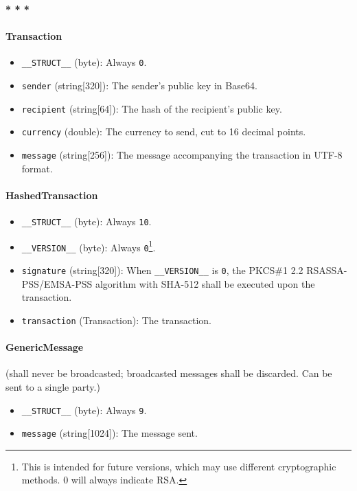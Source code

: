 \documentclass{article}
\begin{document}
{\begin{center}
	{\bf{* * *}}
\end{center}

\paragraph{Transaction}
\begin{itemize}
	\item \verb|__STRUCT__| (byte): Always \verb|0|.
	\item \verb|sender| (string[320]): The sender's public key
		in Base64.
	\item \verb|recipient| (string[64]): The hash of
		the recipient's public key.
	\item \verb|currency| (double): The currency to send, cut to
		16 decimal points.
	\item \verb|message| (string[256]): The message accompanying
		the transaction in UTF-8 format.
\end{itemize}

\paragraph{HashedTransaction}
\begin{itemize}
	\item \verb|__STRUCT__| (byte): Always \verb|10|.
	\item \verb|__VERSION__| (byte): Always \verb|0|\footnote{
			This is intended for future versions, which may use different
			cryptographic methods. 0 will always indicate RSA.
		}.
	\item \verb|signature| (string[320]): When \verb|__VERSION__| is
		\verb|0|, the PKCS\#1 2.2 RSASSA-PSS/EMSA-PSS algorithm with SHA-512
		shall be executed upon the transaction.
	\item \verb|transaction| (Transaction): The transaction.
\end{itemize}

\paragraph{GenericMessage} (shall never be broadcasted; broadcasted messages
shall be discarded. Can be sent to a single party.)
\begin{itemize}
	\item \verb|__STRUCT__| (byte): Always \verb|9|.
	\item \verb|message| (string[1024]): The message sent.
\end{itemize}

}
\end{document}
